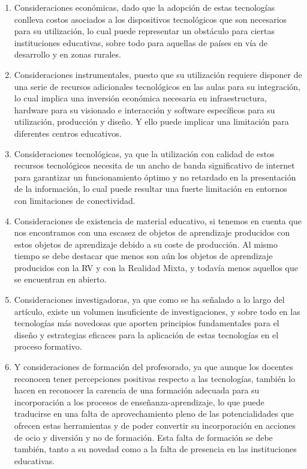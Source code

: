 \documentclass[spanish]{textolivre}
\begin{document}
\begin{enumerate}
\item Consideraciones económicas, dado que la adopción de estas tecnologías conlleva costos asociados a los dispositivos tecnológicos que son necesarios para su utilización, lo cual puede representar un obstáculo para ciertas instituciones educativas, sobre todo para aquellas de países en vía de desarrollo y en zonas rurales.
\item Consideraciones instrumentales, puesto que su utilización requiere disponer de una serie de recursos adicionales tecnológicos en las aulas para su integración, lo cual implica una inversión económica necesaria en infraestructura, hardware para su visionado e interacción y software específicos para su utilización, producción y diseño. Y ello puede implicar una limitación para diferentes centros educativos.
\item Consideraciones tecnológicas, ya que la utilización con calidad de estos recursos tecnológicos necesita de un ancho de banda significativo de internet para garantizar un funcionamiento óptimo y no retardado en la presentación de la información, lo cual puede resultar una fuerte limitación en entornos con limitaciones de conectividad.
\item Consideraciones de existencia de material educativo, si tenemos en cuenta que nos encontramos con una escasez de objetos de aprendizaje producidos con estos objetos de aprendizaje debido a su coste de producción. Al mismo tiempo se debe destacar que menos son aún los objetos de aprendizaje producidos con la RV y con la Realidad Mixta, y todavía menos aquellos que se encuentran en abierto.
\item Consideraciones investigadoras, ya que como se ha señalado a lo largo del artículo, existe un volumen insuficiente de investigaciones, y sobre todo en las tecnologías más novedosas que aporten principios fundamentales para el diseño y estrategias eficaces para la aplicación de estas tecnologías en el proceso formativo.
\item Y consideraciones de formación del profesorado, ya que aunque los docentes reconocen tener percepciones positivas respecto a las tecnologías, también lo hacen en reconocer la carencia de una formación adecuada para su incorporación a los procesos de enseñanza-aprendizaje, lo que puede traducirse en una falta de aprovechamiento pleno de las potencialidades que ofrecen estas herramientas y de poder convertir su incorporación en acciones de ocio y diversión y no de formación. Esta falta de formación se debe también, tanto a su novedad como a la falta de presencia en las instituciones educativas.
\end{enumerate}
\end{document}
